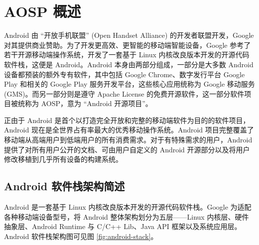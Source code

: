 \section{AOSP 概述}\label{aosp-introduction}

Android 由 “开放手机联盟” (Open Handset Alliance) 的开发者联盟开发，Google 对其提供商业赞助。为了开发更高效、更智能的移动端智能设备，Google 参考了若干开源移动端操作系统，开发了一套基于 Linux 内核改良版本开发的开源代码软件栈，这便是 Android\cite{PLATFORMARCHITECTURE}。Android 本身由两部分组成，一部分是大多数 Android 设备都预装的额外专有软件，其中包括 Google Chrome、数字发行平台 Google Play 和相关的 Google Play 服务开发平台，这些核心应用统称为 Google 移动服务 (GMS)。而另一部分则是遵守 Apache License 的免费开源软件，这一部分软件项目被统称为 AOSP，意为 “Android 开源项目”。

正由于 Android 是首个以打造完全开放和完整的移动端软件为目的的软件项目，Android 现在是全世界占有率最大的优秀移动操作系统。Android 项目完整覆盖了移动端从高端用户到低端用户的所有消费需求。对于有特殊需求的用户，Android 提供了对所有用户公开的文档、可由用户自定义的 Android 开源部分以及将用户修改移植到几乎所有设备的构建系统。

\subsection{Android 软件栈架构简述}

Android 是一套基于 Linux 内核改良版本开发的开源代码软件栈。Google 为适配各种移动端设备型号，将 Android 整体架构划分为五层——Linux 内核层、硬件抽象层、Android Runtime 与 C/C++ Lib、Java API 框架以及系统应用层。Android 软件栈架构图可见图 \ref{fig:android-stack}。

